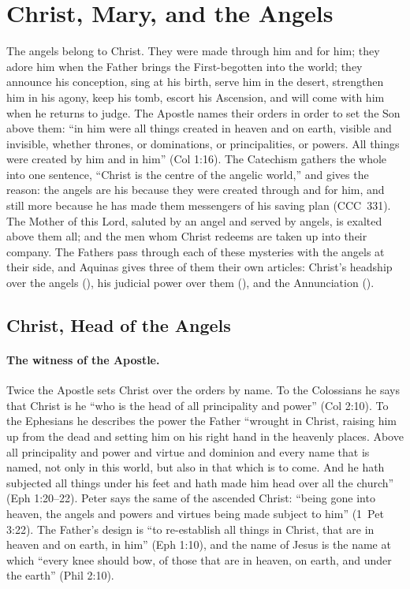 \section{Christ, Mary, and the Angels}\label{sec:christ-mary}

The angels belong to Christ. They were made through him and for him; they
adore him when the Father brings the First-begotten into the world; they
announce his conception, sing at his birth, serve him in the desert,
strengthen him in his agony, keep his tomb, escort his Ascension, and will
come with him when he returns to judge. The Apostle names their orders in
order to set the Son above them: ``in him were all things created in heaven
and on earth, visible and invisible, whether thrones, or dominations, or
principalities, or powers. All things were created by him and in him'' (Col
1:16). The Catechism gathers the whole into one sentence, ``Christ is the
centre of the angelic world,'' and gives the reason: the angels are his
because they were created through and for him, and still more because he
has made them messengers of his saving plan (CCC~331). The Mother of this
Lord, saluted by an angel and served by angels, is exalted above them all;
and the men whom Christ redeems are taken up into their company. The
Fathers pass through each of these mysteries with the angels at their side,
and Aquinas gives three of them their own articles: Christ's headship over
the angels (), his judicial power over them (), and the Annunciation ().

\sectionguard
\subsection{Christ, Head of the Angels}\label{sec:cm-head}

\paragraph{The witness of the Apostle.} Twice the Apostle sets Christ over
the orders by name. To the Colossians he says that Christ is he ``who is
the head of all principality and power'' (Col 2:10). To the Ephesians he
describes the power the Father ``wrought in Christ, raising him up from the
dead and setting him on his right hand in the heavenly places. Above all
principality and power and virtue and dominion and every name that is
named, not only in this world, but also in that which is to come. And he
hath subjected all things under his feet and hath made him head over all
the church'' (Eph 1:20--22). Peter says the same of the ascended Christ:
``being gone into heaven, the angels and powers and virtues being made
subject to him'' (1~Pet 3:22). The Father's design is ``to re-establish all
things in Christ, that are in heaven and on earth, in him'' (Eph 1:10), and
the name of Jesus is the name at which ``every knee should bow, of those
that are in heaven, on earth, and under the earth'' (Phil 2:10).


